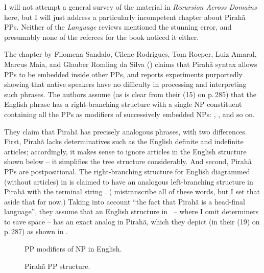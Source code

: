 \documentclass[output=paper,colorlinks,citecolor=brown
]{langscibook}
\begin{document}
I will not attempt a general survey of the material in
\textit{Recursion Across Domains} here, but I will just address a
particularly incompetent chapter about Pirahã PPs. Neither of
the \textit{Language} reviews mentioned the stunning error, and
presumably none of the referees for the book noticed it either.

The chapter by Filomena Sandalo, Cilene Rodrigues, Tom Roeper, Luiz Amaral,
Marcus Maia, and Glauber Romling da Silva (\citeyear{SandaloEtAl18})
claims that Pirahã syntax allows PPs to be embedded inside other PPs,
and reports experiments purportedly showing that native speakers have no
difficulty in processing and interpreting such phrases. The authors assume
(as is clear from their (15) on p.\,285) that the English phrase
 has a
right-branching structure with a single NP constituent containing
all the PPs as modifiers of successively embedded NPs:
,
, and so on.

They claim that Pirahã has precisely analogous phrases, with two
differences. First, Pirahã lacks determinatives such as the English
definite and indefinite articles; accordingly, it makes sense to ignore
articles in the English structure shown below -- it simplifies the tree
structure considerably.  And second, Pirahã PPs are postpositional.
The right-branching structure for English diagrammed (without articles)
in  is claimed to have an analogous left-branching structure in
Pirahã with the terminal string . (\citet{SandaloEtAl18} mistranscribe all of these
words, but I set that aside that for now.) Taking into account ``the
fact that Pirahã is a head-final language'', they assume that an
English structure in ~-- where I omit determiners to save space
-- has an exact analog in Pirahã, which they depict
(in their (19) on p.\,287) as shown in .

\begin{figure}
\begin{floatrow}
        {\caption{PP modifiers of NP in English.}\label{fig:pullum:1a}}
        {\caption{ Pirahã PP structure.}\label{fig:pullum:1b}}
\end{floatrow}
\end{figure}
\end{document}
